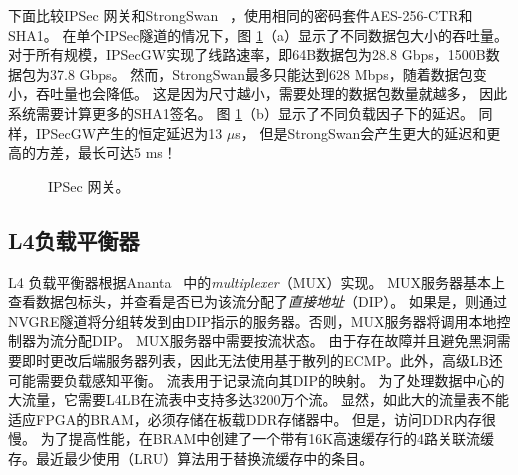 下面比较IPSec 网关和StrongSwan~ \cite {strongswan}，使用相同的密码套件AES-256-CTR和SHA1。
在单个IPSec隧道的情况下，图 \ref {clicknp:fig:IPSec}（a）显示了不同数据包大小的吞吐量。
对于所有规模，IPSecGW实现了线路速率，即64B数据包为28.8 Gbps，1500B数据包为37.8 Gbps。
然而，StrongSwan最多只能达到628 Mbps，随着数据包变小，吞吐量也会降低。
这是因为尺寸越小，需要处理的数据包数量就越多，
因此系统需要计算更多的SHA1签名。
图 \ref {clicknp:fig:IPSec}（b）显示了不同负载因子下的延迟。 同样，IPSecGW产生的恒定延迟为13 $\mu$s，
但是StrongSwan会产生更大的延迟和更高的方差，最长可达5 ms！



\begin{figure}[htbp]
	\centering
	
	\caption{IPSec 网关。}
	
	\label{clicknp:fig:IPSec}
\end{figure}



\subsection{L4负载平衡器}
L4 负载平衡器根据Ananta~ \cite {ananta}中的\textit {multiplexer}（MUX）实现。
MUX服务器基本上查看数据包标头，并查看是否已为该流分配了\textit {直接地址}（DIP）。
如果是，则通过NVGRE隧道将分组转发到由DIP指示的服务器。否则，MUX服务器将调用本地控制器为流分配DIP。
MUX服务器中需要按流状态。
由于存在故障并且避免黑洞需要即时更改后端服务器列表，因此无法使用基于散列的ECMP。此外，高级LB还可能需要负载感知平衡。
流表用于记录流向其DIP的映射。
为了处理数据中心的大流量，它需要L4LB在流表中支持多达3200万个流。
显然，如此大的流量表不能适应FPGA的BRAM，必须存储在板载DDR存储器中。
但是，访问DDR内存很慢。
为了提高性能，在BRAM中创建了一个带有16K高速缓存行的4路关联流缓存。最近最少使用（LRU）算法用于替换流缓存中的条目。

